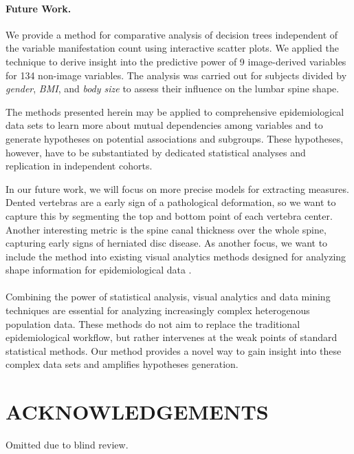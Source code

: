 \documentclass[a4paper,twoside]{style/article}
\newcommand{\com}[1]{\textcolor{orange}{\uline{#1}}}
\begin{document}
\paragraph{Future Work.}
We provide a method for comparative analysis of decision trees independent of the variable manifestation count using interactive scatter plots.
We applied the technique to derive insight into the predictive power of 9 image-derived variables for 134 non-image variables.
The analysis was carried out for subjects divided by \emph{gender}, \emph{BMI}, and \emph{body size} to assess their influence on the lumbar spine shape.

The methods presented herein may be applied to comprehensive epidemiological data sets to learn more about mutual dependencies among variables and to generate hypotheses on potential associations and subgroups.
%
These hypotheses, however, have to be substantiated by dedicated statistical analyses and replication in independent cohorts.

In our future work, we will focus on more precise models for extracting measures.
Dented vertebras are a early sign of a pathological deformation, so we want to capture this by segmenting the top and bottom point of each vertebra center.
Another interesting metric is the spine canal thickness over the whole spine, capturing early signs of herniated disc disease.
As another focus, we want to include the method into existing visual analytics methods designed for analyzing shape information for epidemiological data \cite{Klemm2014VIS}.
\\\\
Combining the power of statistical analysis, visual analytics and data mining techniques are essential for analyzing increasingly complex heterogenous population data.
These methods do not aim to replace the traditional epidemiological workflow, but rather intervenes at the weak points of standard statistical methods.
Our method provides a novel way to gain insight into these complex data sets and amplifies hypotheses generation.

\section*{\uppercase{Acknowledgements}}
\noindent Omitted due to blind review.
\end{document}
